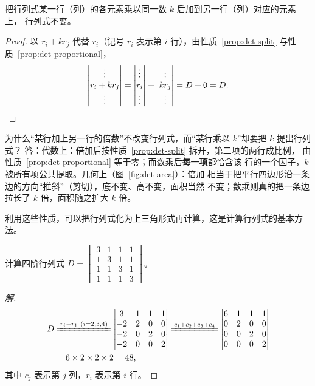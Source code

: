 \begin{property}[倍加不变]\label{prop:det-add}
把行列式某一行（列）的各元素乘以同一数 $k$ 后加到另一行（列）对应的元素上，
行列式不变。
\end{property}
\begin{proof}
以 $r_i+k r_j$ 代替 $r_i$（记号 $r_i$ 表示第 $i$ 行），由性质~\ref{prop:det-split}
与性质~\ref{prop:det-proportional}，
\[
  \begin{vmatrix} \vdots \\ r_i+kr_j \\ \vdots \end{vmatrix}
  =\begin{vmatrix} \vdots \\ r_i \\ \vdots \end{vmatrix}
  +\begin{vmatrix} \vdots \\ kr_j \\ \vdots \end{vmatrix}
  =D+0=D .\qedhere
\]
\end{proof}

\begin{qa}{为什么“某行加上另一行的倍数”不改变行列式，而“某行乘以 $k$”却要把 $k$ 提出行列式？}
答：代数上：倍加后按性质~\ref{prop:det-split} 拆开，第二项的两行成比例，
由性质~\ref{prop:det-proportional} 等于零；而数乘后\textbf{每一项}都恰含该
行的一个因子，$k$ 被所有项公共提取。几何上（图~\ref{fig:det-area}）：倍加
相当于把平行四边形沿一条边的方向“推斜”（剪切），底不变、高不变，面积当然
不变；数乘则真的把一条边拉长了 $k$ 倍，面积随之扩大 $k$ 倍。
\end{qa}

利用这些性质，可以把行列式化为上三角形式再计算，这是计算行列式的基本方法。

\begin{example}\label{ex:det-48}
计算四阶行列式
$D=\begin{vmatrix} 3 & 1 & 1 & 1 \\ 1 & 3 & 1 & 1 \\ 1 & 1 & 3 & 1 \\ 1 & 1 & 1 & 3 \end{vmatrix}$。
\end{example}
\begin{proof}[解]
\begin{align*}
  D &\xlongequal{r_i-r_1\ (i=2,3,4)}
  \begin{vmatrix} 3 & 1 & 1 & 1 \\ -2 & 2 & 0 & 0 \\ -2 & 0 & 2 & 0 \\ -2 & 0 & 0 & 2 \end{vmatrix}
  \xlongequal{c_1+c_2+c_3+c_4}
  \begin{vmatrix} 6 & 1 & 1 & 1 \\ 0 & 2 & 0 & 0 \\ 0 & 0 & 2 & 0 \\ 0 & 0 & 0 & 2 \end{vmatrix} \\
    &=6\times 2\times 2\times 2=48 ,
\end{align*}
其中 $c_j$ 表示第 $j$ 列，$r_i$ 表示第 $i$ 行。
\end{proof}

